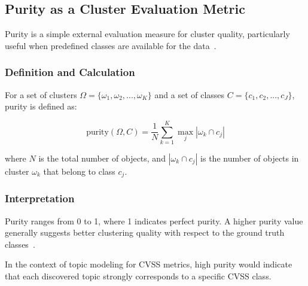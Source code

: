 \documentclass[12pt]{article}
\begin{document}
\subsection{Purity as a Cluster Evaluation Metric}\label{sec:purity}

Purity is a simple external evaluation measure for cluster quality, particularly useful when
predefined classes are available for the data~\cite{purity_usuage}.

\subsubsection{Definition and Calculation}

For a set of clusters $\Omega = \{\omega_1, \omega_2, ..., \omega_K\}$ and a set of classes $C =
	\{c_1, c_2, ..., c_J\}$, purity is defined as:

\begin{equation}
	\text{purity}(\Omega, C) = \frac{1}{N} \sum_{k=1}^K \max_j |\omega_k \cap c_j|
\end{equation}

where $N$ is the total number of objects, and $|\omega_k \cap c_j|$ is the number of objects in
cluster $\omega_k$ that belong to class $c_j$.

\subsubsection{Interpretation}

Purity ranges from 0 to 1, where 1 indicates perfect purity. A higher purity value generally
suggests better clustering quality with respect to the ground truth classes~\cite{purity_info_ret}.

In the context of topic modeling for CVSS metrics, high purity would indicate that each discovered
topic strongly corresponds to a specific CVSS class.
\end{document}
